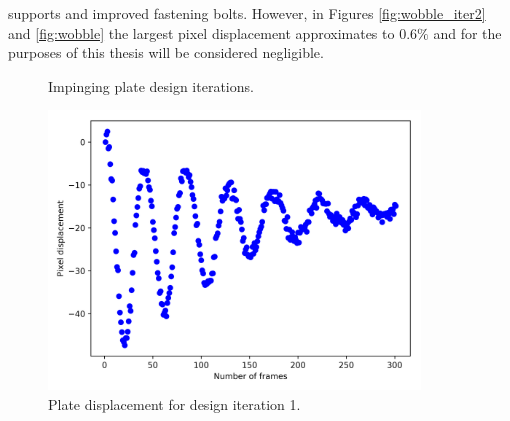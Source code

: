 supports and improved fastening bolts. However, in Figures \ref{fig:wobble_iter2} and \ref{fig:wobble} the largest pixel displacement approximates to $0.6\%$ and for the purposes of this thesis will be considered negligible.

\begin{figure}[H]
  \centering
  \hfill
  \caption{Impinging plate design iterations.}
  \label{fig:plate_iter}
\end{figure}

\begin{figure}[H] 
	\centering
	\includegraphics[width=0.88\textwidth]{wobble_iter1.png} 
	\caption{Plate displacement for design iteration 1.}
	\label{fig:wobble_iter1}
\end{figure}

